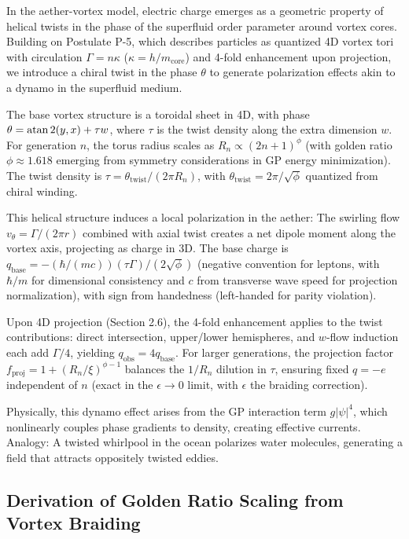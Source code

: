 \documentclass{article}
\begin{document}
In the aether-vortex model, electric charge emerges as a geometric property of helical twists in the phase of the superfluid order parameter around vortex cores. Building on Postulate P-5, which describes particles as quantized 4D vortex tori with circulation $\Gamma = n \kappa$ ($\kappa = h / m_{\text{core}}$) and 4-fold enhancement upon projection, we introduce a chiral twist in the phase $\theta$ to generate polarization effects akin to a dynamo in the superfluid medium.

The base vortex structure is a toroidal sheet in 4D, with phase $\theta = \atan2(y, x) + \tau w$, where $\tau$ is the twist density along the extra dimension $w$. For generation $n$, the torus radius scales as $R_n \propto (2n+1)^\phi$ (with golden ratio $\phi \approx 1.618$ emerging from symmetry considerations in GP energy minimization). The twist density is $\tau = \theta_{\text{twist}} / (2\pi R_n)$, with $\theta_{\text{twist}} = 2\pi / \sqrt{\phi}$ quantized from chiral winding.

This helical structure induces a local polarization in the aether: The swirling flow $v_{\theta} = \Gamma / (2\pi r)$ combined with axial twist creates a net dipole moment along the vortex axis, projecting as charge in 3D. The base charge is $q_{\text{base}} = - (\hbar / (m c)) (\tau \Gamma) / (2 \sqrt{\phi})$ (negative convention for leptons, with $\hbar / m$ for dimensional consistency and $c$ from transverse wave speed for projection normalization), with sign from handedness (left-handed for parity violation).

Upon 4D projection (Section 2.6), the 4-fold enhancement applies to the twist contributions: direct intersection, upper/lower hemispheres, and $w$-flow induction each add $\Gamma/4$, yielding $q_{\text{obs}} = 4 q_{\text{base}}$. For larger generations, the projection factor $f_{\text{proj}} = 1 + (R_n / \xi)^{\phi - 1}$ balances the $1/R_n$ dilution in $\tau$, ensuring fixed $q = -e$ independent of $n$ (exact in the $\epsilon \to 0$ limit, with $\epsilon$ the braiding correction).

Physically, this dynamo effect arises from the GP interaction term $g |\psi|^4$, which nonlinearly couples phase gradients to density, creating effective currents. Analogy: A twisted whirlpool in the ocean polarizes water molecules, generating a field that attracts oppositely twisted eddies.

\subsection{Derivation of Golden Ratio Scaling from Vortex Braiding}
\end{document}

